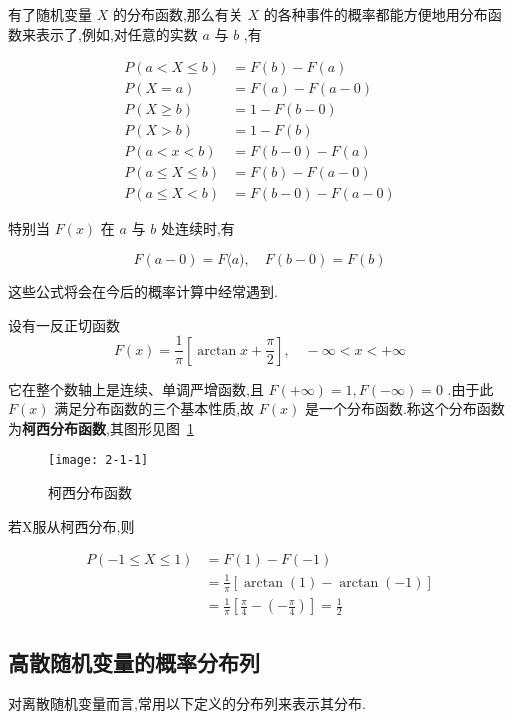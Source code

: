 有了随机变量 $ X $ 的分布函数,那么有关 $ X $ 的各种事件的概率都能方便地用分布函数来表示了,例如,对任意的实数 $ a $ 与 $ b $ ,有

\[ 
\begin{array}{rl}
P(a<X \leqslant b)&=F(b)-F(a)\\ 
P(X=a)&=F(a)-F(a-0) \\
P(X \geqslant b)&=1-F(b-0)\\
P(X>b)&=1-F(b)\\ 
P(a<x<b)&=F(b-0)-F(a)\\
P(a \leqslant X \leqslant b)&=F(b)-F(a-0)\\ 
P(a \leqslant X<b)&=F(b-0)-F(a-0)
\end{array}
\]

特别当 $ F(x) $ 在 $ a $ 与 $ b $ 处连续时,有

\[ 
F(a-0)=F\langle a), \quad F(b-0)=F(b)
\]

这些公式将会在今后的概率计算中经常遇到.

\begin{example}\label{exam:2.1.2}
	设有一反正切函数
	\[ 
	F(x)=\frac{1}{\pi}\left[\arctan x+\frac{\pi}{2}\right], \quad-\infty<x<+\infty
	\]
	
	它在整个数轴上是连续、单调严增函数,且 $ F(+\infty)=1, F(-\infty)=0 $ .由于此 $ F(x) $ 满足分布函数的三个基本性质,故 $ F(x) $ 是一个分布函数.称这个分布函数为\textbf{柯西分布函数},其图形见图~\ref{fig:2.1.1}
	
	\begin{figure}
		\centering
		\texttt{[image: 2-1-1]}
		\caption{柯西分布函数}
		\label{fig:2.1.1}
	\end{figure}
	
	若X服从柯西分布,则
	
	\[ 
	\begin{aligned} P(-1 \leqslant X \leqslant 1) &=F(1)-F(-1) \\ &=\frac{1}{\pi}[\arctan (1)-\arctan (-1)] \\ &=\frac{1}{\pi}\left[\frac{\pi}{4}-\left(-\frac{\pi}{4}\right)\right]=\frac{1}{2} \end{aligned}
	\]
	
\end{example}

\subsection{高散随机变量的概率分布列}

对离散随机变量而言,常用以下定义的分布列来表示其分布.

